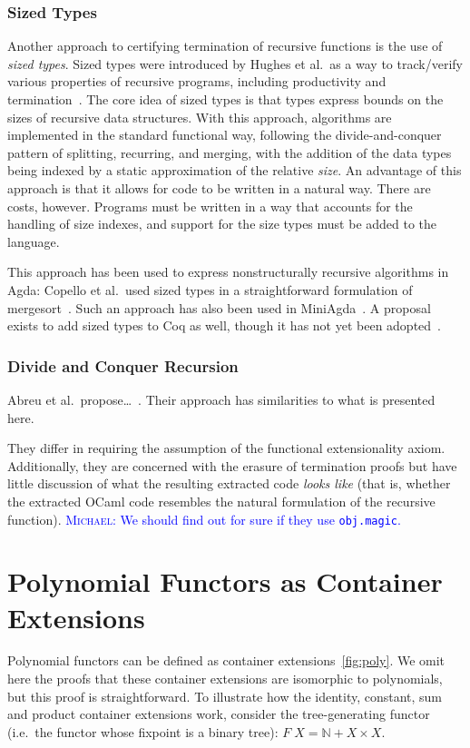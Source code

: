 \documentclass[anonymous, a4paper, UKenglish, cleveref, autoref, thm-restate]{lipics-v2021}
\newcommand{\mvol}[1]{\textcolor{blue}{\textsc{Michael}: #1}}
\begin{document}
\subsubsection{Sized Types}

Another approach to certifying termination of recursive functions is the use of
\emph{sized types}. Sized types were introduced by Hughes et al.\ as a way to
track/verify various properties of recursive programs, including productivity
and termination~\cite{HughesPS96}. The core idea of sized types is that types
express bounds on the sizes of recursive data structures. With this approach,
algorithms are implemented in the standard functional way, following the
divide-and-conquer pattern of splitting, recurring, and merging, with the
addition of the data types being indexed by a static approximation of the
relative \emph{size}. An advantage of this approach is that it allows for code
to be written in a natural way. There are costs, however. Programs must be
written in a way that accounts for the handling of size indexes, and support for
the size types must be added to the language.

This approach has been used to express nonstructurally recursive
algorithms in Agda: Copello et al.\ used sized types in a straightforward
formulation of mergesort~\cite{CopelloTB14}. Such an approach has also been used
in MiniAgda~\cite{abs-1202-3496}. A proposal exists to add sized types to
Coq as well, though it has not yet been adopted~\cite{CHAN_2023}.

\subsubsection{Divide and Conquer Recursion}

Abreu et al.\ propose\ldots~\cite{AbreuDHJMS23}. Their approach has similarities to what is presented here.

They differ in requiring the assumption of the functional extensionality axiom.
Additionally, they are concerned with the erasure of termination proofs but have
little discussion of what the resulting extracted code \emph{looks like} (that
is, whether the extracted OCaml code resembles the natural formulation of the
recursive function).
\mvol{We should find out for sure if they use \texttt{obj.magic}.}



\appendix
\section{Polynomial Functors as Container Extensions}
\label{sec:pol-containers}
Polynomial functors can be defined as container extensions~\ref{fig:poly}. We
omit here the proofs that these container extensions are isomorphic to
polynomials, but this proof is straightforward. To illustrate how the identity,
constant, sum and product container extensions work, consider the
tree-generating functor (i.e.\ the functor whose fixpoint is a binary tree):
$F\; X = \mathbb{N} + X \times X$.
\end{document}

